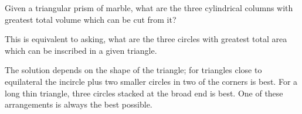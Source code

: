  Given a triangular prism of marble, what are the three cylindrical columns
with greatest total volume which can be cut from it?
\par
This is equivalent to asking, what are the three circles with greatest
total area which can be inscribed in a given triangle.
\par
The solution depends on the shape of the triangle; for triangles
close to equilateral the incircle plus two smaller circles in two of 
the corners is best. For a long thin triangle, three circles stacked
at the broad end is best. One of these arrangements is always the best 
possible.
